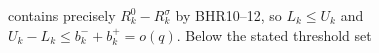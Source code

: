 contains precisely $R_k^0-R_k^\sigma$ by BHR10--12, so
$L_k\leq U_k$ and $U_k-L_k\leq b_k^-+b_k^+=o(q)$.
Below the stated threshold set